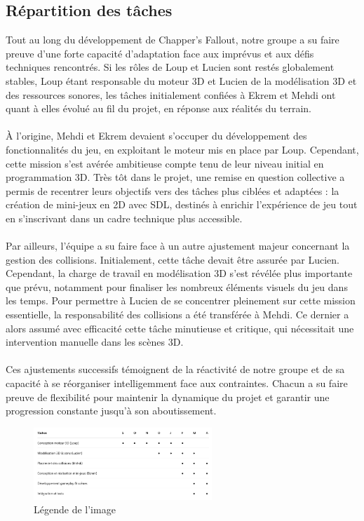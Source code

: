     \subsection{Répartition des tâches}
        Tout au long du développement de Chapper's Fallout, notre groupe a su faire preuve d’une forte capacité d’adaptation face aux imprévus et aux défis techniques rencontrés. 
        Si les rôles de Loup et Lucien sont restés globalement stables, Loup étant responsable du moteur 3D et Lucien de la modélisation 3D et des ressources sonores, les 
        tâches initialement confiées à Ekrem et Mehdi ont quant à elles évolué au fil du projet, en réponse aux réalités du terrain.
        \\ \\
        À l’origine, Mehdi et Ekrem devaient s’occuper du développement des \\fonctionnalités du jeu, en exploitant le moteur mis en place par Loup. Cependant, cette mission 
        s’est avérée ambitieuse compte tenu de leur niveau initial en programmation 3D. Très tôt dans le projet, une remise en question collective a permis de recentrer 
        leurs objectifs vers des tâches plus ciblées et adaptées : la création de mini-jeux en 2D avec SDL, destinés à enrichir l’expérience de jeu tout en s’inscrivant 
        dans un cadre technique plus accessible.
        \\ \\
        Par ailleurs, l’équipe a su faire face à un autre ajustement majeur concernant la gestion des collisions. Initialement, cette tâche devait être assurée par Lucien. 
        Cependant, la charge de travail en modélisation 3D s’est révélée plus importante que prévu, notamment pour finaliser les nombreux éléments visuels du jeu dans les 
        temps. Pour permettre à Lucien de se concentrer pleinement sur cette mission essentielle, la responsabilité des collisions a été transférée à Mehdi. Ce dernier a 
        alors assumé avec efficacité cette tâche minutieuse et critique, qui nécessitait une intervention manuelle dans les scènes 3D. 
        \\ \\
        Ces ajustements successifs témoignent de la réactivité de notre groupe et de sa capacité à se réorganiser intelligemment face aux contraintes. Chacun a su faire 
        preuve de flexibilité pour maintenir la dynamique du projet et garantir une progression constante jusqu’à son aboutissement. 
        \begin{figure}[h]
            \centering
            \includegraphics[width=0.6\textwidth]{images/gantt_effectif.png}
            \caption{Légende de l'image}
            \label{fig:mon_image}
        \end{figure}
